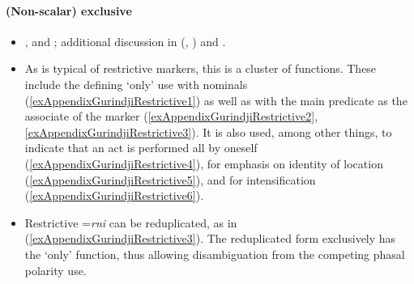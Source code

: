 \paragraph{(Non-scalar) exclusive}
\label{appendixGurindjiRestrictive}
\begin{itemize}
	\sloppy
	\item \textcite{McConvell1983}, \textcite[587–596]{MeakinsMcConvell2021} and \textcite[s.v. \textit{rni}]{MeakinsEtAl2013}; additional discussion in \citeauthor{vanBaar1991} (\citeyear{vanBaar1991}, \citeyear[112–113]{vanBaar1997}) and \textcite{SchultzeBerndt2002}.
	\item As is typical of restrictive markers, this is a cluster of functions. These include the defining \lq only' use with nominals  (\ref{exAppendixGurindjiRestrictive1}) as well as with the main predicate as the associate of the marker (\ref{exAppendixGurindjiRestrictive2}, \ref{exAppendixGurindjiRestrictive3}). It is also used, among other things, to indicate that an act is performed all by oneself (\ref{exAppendixGurindjiRestrictive4}), for emphasis on identity of location (\ref{exAppendixGurindjiRestrictive5}), and for intensification (\ref{exAppendixGurindjiRestrictive6}).
	\item Restrictive \mbox{=\textit{rni}} can be reduplicated, as in (\ref{exAppendixGurindjiRestrictive3}). The reduplicated form exclusively has the \lq only' function, thus allowing disambiguation from the competing phasal polarity use.
\end{itemize}
